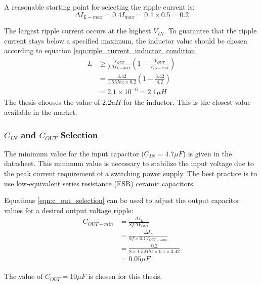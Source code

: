 \documentclass[\main/thesis.tex]{subfiles}
\begin{document}
A reasonable starting point for selecting the ripple current
is:
\begin{equation}
    \Delta I_{L-max} = 0.4 I_{max} = 0.4 \times 0.5 = 0.2
\end{equation}

The largest ripple current occurs at the highest $V_{IN}$. To guarantee that the ripple current stays below a specified maximum, the inductor value should be chosen according to equation \ref{eqn:riple_current_inductor_condition}.
\begin{equation}
    \begin{split}
        L &\geq \frac{V_{OUT}}{f\Delta I_{L-max}} \left( 1 - \frac{V_{OUT}}{V_{IN-max}}\right)  \\
        &= \frac{3.42}{1.5Mhz \times 0.2} \left( 1 - \frac{3.42}{4.2}\right) \\
        &= 2.1 \times 10^{-6} = 2.1 \mu H
    \end{split}
    \label{eqn:riple_current_inductor_condition}
\end{equation}
The thesis chooses the value of $2.2uH$ for the inductor. This is the closest value available in the market.

\subsubsection{$C_{IN}$ and $C_{OUT}$ Selection}
The minimum value for the input capacitor ($C_{IN} = 4.7 \mu F$) is given in the datasheet. This minimum value is necessary to stabilize the input voltage due to the peak current requirement of a switching power supply.
The best practice is to use low-equivalent series resistance (ESR) ceramic capacitors. 

Equations \ref{eqn:c_out_selection} can be used to adjust the output capacitor values for a desired output voltage ripple:
\begin{equation}
    \begin{split}
        C_{OUT-min} &= \frac{\Delta I_{L}}{8f\Delta V_{OUT}} \\
        &= \frac{\Delta I_{L}}{8f \times 0.1V_{OUT-max}} \\
        &= \frac{0.2}{8 \times 1.5Mhz \times 0.1 \times 3.42} \\
        &= 0.05 \mu F
    \end{split}
    \label{eqn:c_out_selection}
\end{equation}

The value of $C_{OUT} = 10\mu F$ is chosen for this thesis.
\end{document}
